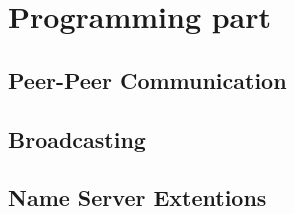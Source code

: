 \section{Programming part}
\subsection{Peer-Peer Communication}

\subsection{Broadcasting}

\subsection{Name Server Extentions}

